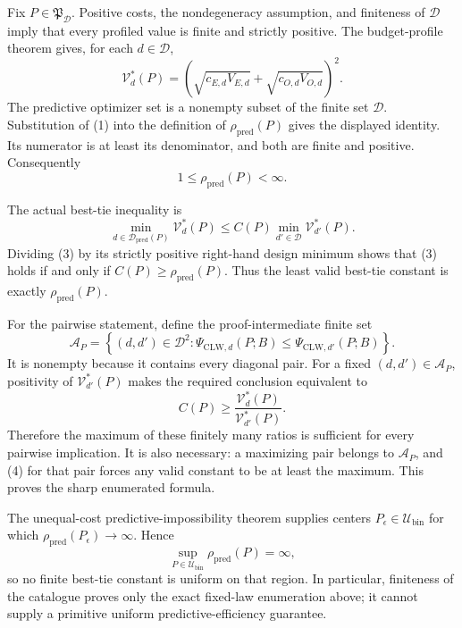 Fix \(P\in\mathfrak P_{\mathcal D}\).  Positive costs, the nondegeneracy assumption, and finiteness of \(\mathcal D\) imply that every profiled value is finite and strictly positive.  The budget-profile theorem gives, for each \(d\in\mathcal D\),
\[
 \mathcal V_d^*(P)
 =\left(\sqrt{c_{E,d}V_{E,d}}+
 \sqrt{c_{O,d}V_{O,d}}\right)^2. \tag{1}
\]
The predictive optimizer set is a nonempty subset of the finite set \(\mathcal D\).  Substitution of (1) into the definition of \(\rho_{\mathrm{pred}}(P)\) gives the displayed identity.  Its numerator is at least its denominator, and both are finite and positive.  Consequently
\[
 1\le\rho_{\mathrm{pred}}(P)<\infty. \tag{2}
\]

The actual best-tie inequality is
\[
 \min_{d\in\mathcal D_{\mathrm{pred}}(P)}\mathcal V_d^*(P)
 \le C(P)\min_{d'\in\mathcal D}\mathcal V_{d'}^*(P). \tag{3}
\]
Dividing (3) by its strictly positive right-hand design minimum shows that (3) holds if and only if \(C(P)\ge\rho_{\mathrm{pred}}(P)\).  Thus the least valid best-tie constant is exactly \(\rho_{\mathrm{pred}}(P)\).

For the pairwise statement, define the proof-intermediate finite set
\[
 \mathcal A_P=\left\{(d,d')\in\mathcal D^2:
 \Psi_{\mathrm{CLW},d}(P;B)
 \le\Psi_{\mathrm{CLW},d'}(P;B)\right\}.
\]
It is nonempty because it contains every diagonal pair.  For a fixed \((d,d')\in\mathcal A_P\), positivity of \(\mathcal V_{d'}^*(P)\) makes the required conclusion equivalent to
\[
 C(P)\ge
 \frac{\mathcal V_d^*(P)}{\mathcal V_{d'}^*(P)}. \tag{4}
\]
Therefore the maximum of these finitely many ratios is sufficient for every pairwise implication.  It is also necessary: a maximizing pair belongs to \(\mathcal A_P\), and (4) for that pair forces any valid constant to be at least the maximum.  This proves the sharp enumerated formula.

The unequal-cost predictive-impossibility theorem supplies centers \(P_\epsilon\in\mathcal U_{\mathrm{bin}}\) for which \(\rho_{\mathrm{pred}}(P_\epsilon)\to\infty\).  Hence
\[
 \sup_{P\in\mathcal U_{\mathrm{bin}}}\rho_{\mathrm{pred}}(P)=\infty,
\]
so no finite best-tie constant is uniform on that region.  In particular, finiteness of the catalogue proves only the exact fixed-law enumeration above; it cannot supply a primitive uniform predictive-efficiency guarantee.